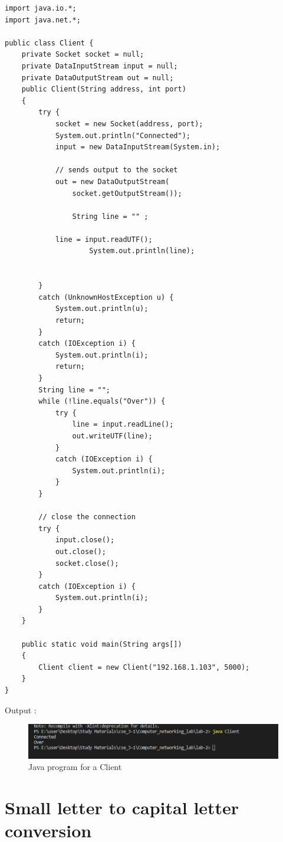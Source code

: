 \documentclass[11pt]{article}
\begin{document}
\begin{verbatim}
import java.io.*;
import java.net.*;

public class Client {
	private Socket socket = null;
	private DataInputStream input = null;
	private DataOutputStream out = null;
	public Client(String address, int port)
	{
		try {
			socket = new Socket(address, port);
			System.out.println("Connected");
			input = new DataInputStream(System.in);

			// sends output to the socket
			out = new DataOutputStream(
				socket.getOutputStream());

                String line = "" ;

            line = input.readUTF();
                    System.out.println(line);


		}
		catch (UnknownHostException u) {
			System.out.println(u);
			return;
		}
		catch (IOException i) {
			System.out.println(i);
			return;
		}
		String line = "";
		while (!line.equals("Over")) {
			try {
				line = input.readLine();
				out.writeUTF(line);
			}
			catch (IOException i) {
				System.out.println(i);
			}
		}

		// close the connection
		try {
			input.close();
			out.close();
			socket.close();
		}
		catch (IOException i) {
			System.out.println(i);
		}
	}

	public static void main(String args[])
	{
		Client client = new Client("192.168.1.103", 5000);
	}
}
\end{verbatim}

 Output : 
\begin{figure}[!h]
\centering
\includegraphics[width=\textwidth]{client.png}
\caption{Java program for a Client}
\end{figure}
\FloatBarrier


\section{Small letter to capital letter conversion}
\end{document}
